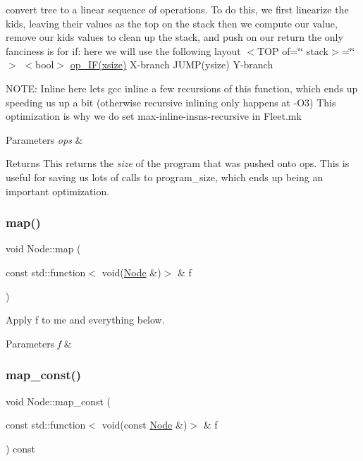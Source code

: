 convert tree to a linear sequence of operations. To do this, we first linearize the kids, leaving their values as the top on the stack then we compute our value, remove our kids\textquotesingle{} values to clean up the stack, and push on our return the only fanciness is for if\+: here we will use the following layout $<$\+T\+O\+P of=\char`\"{}\char`\"{} stack$>$=\char`\"{}\char`\"{}$>$ $<$bool$>$ \hyperlink{_instruction_8h_af2fb7c87c5854c5733d7bb0506b06de7a8f69a9fe993189d72cf7b07e8517801d}{op\+\_\+\+I\+F(xsize)} X-\/branch J\+U\+M\+P(ysize) Y-\/branch

N\+O\+TE\+: Inline here lets gcc inline a few recursions of this function, which ends up speeding us up a bit (otherwise recursive inlining only happens at -\/\+O3) This optimization is why we do set max-\/inline-\/insns-\/recursive in Fleet.\+mk 
\begin{DoxyParams}{Parameters}
{\em ops} & \\
\hline
\end{DoxyParams}
\begin{DoxyReturn}{Returns}
This returns the {\itshape size} of the program that was pushed onto ops. This is useful for saving us lots of calls to program\+\_\+size, which ends up being an important optimization.
\end{DoxyReturn}
\mbox{\label{class_node_adefac3cb7b411321c5af15dad1484834}} 
\subsubsection{\texorpdfstring{map()}{map()}}
{\footnotesize\ttfamily void Node\+::map (\begin{DoxyParamCaption}\item[{const std\+::function$<$ void(\hyperlink{class_node}{Node} \&)$>$ \&}]{f }\end{DoxyParamCaption})\hspace{0.3cm}{\ttfamily [inline]}}

Apply f to me and everything below. 
\begin{DoxyParams}{Parameters}
{\em f} & \\
\hline
\end{DoxyParams}
\mbox{\label{class_node_a4337bb93da78e142c6171fd81acab93c}} 
\subsubsection{\texorpdfstring{map\+\_\+const()}{map\_const()}}
{\footnotesize\ttfamily void Node\+::map\+\_\+const (\begin{DoxyParamCaption}\item[{const std\+::function$<$ void(const \hyperlink{class_node}{Node} \&)$>$ \&}]{f }\end{DoxyParamCaption}) const\hspace{0.3cm}{\ttfamily [inline]}}

